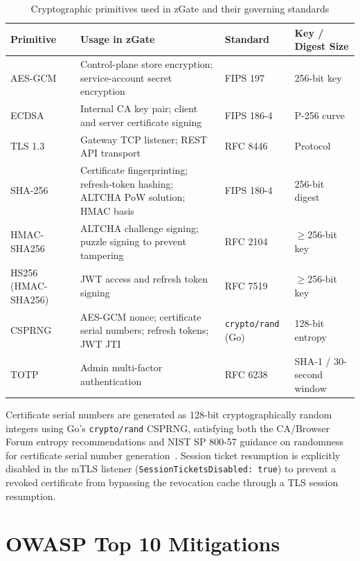 \begin{table}[H]
\small
\centering
\renewcommand{\arraystretch}{1.4}
\begin{tabularx}{\textwidth}{|p{2.8cm}|X|p{3.0cm}|p{3.5cm}|}
\hline

\textbf{Primitive} & \textbf{Usage in zGate} & \textbf{Standard} & \textbf{Key / Digest Size} \\
\hline
AES-GCM & Control-plane store encryption; service-account secret encryption & FIPS 197~\cite{fips-197} & 256-bit key \\
\hline
ECDSA & Internal CA key pair; client and server certificate signing & FIPS 186-4~\cite{fips-186-4} & P-256 curve \\
\hline
TLS 1.3 & Gateway TCP listener; REST API transport & RFC 8446~\cite{tls13} & Protocol \\
\hline
SHA-256 & Certificate fingerprinting; refresh-token hashing; ALTCHA PoW solution; HMAC basis & FIPS 180-4~\cite{fips-180-4} & 256-bit digest \\
\hline
HMAC-SHA256 & ALTCHA challenge signing; puzzle signing to prevent tampering & RFC 2104~\cite{rfc-2104} & $\geq$256-bit key \\
\hline
HS256 (HMAC-SHA256) & JWT access and refresh token signing & RFC 7519~\cite{rfc-7519} & $\geq$256-bit key \\
\hline
CSPRNG & AES-GCM nonce; certificate serial numbers; refresh tokens; JWT JTI & \texttt{crypto/rand} (Go) & 128-bit entropy \\
\hline
TOTP & Admin multi-factor authentication & RFC 6238~\cite{rfc-6238} & SHA-1 / 30-second window \\
\hline
\end{tabularx}
\caption{Cryptographic primitives used in zGate and their governing standards}
\label{tab:crypto-standards}
\end{table}

Certificate serial numbers are generated as 128-bit cryptographically random integers using Go's \texttt{crypto/rand} CSPRNG, satisfying both the CA/Browser Forum entropy recommendations and NIST SP 800-57 guidance on randomness for certificate serial number generation~\cite{nist-key}. Session ticket resumption is explicitly disabled in the mTLS listener (\texttt{SessionTickets\-Disabled:~true}) to prevent a revoked certificate from bypassing the revocation cache through a TLS session resumption.

\section{OWASP Top 10 Mitigations}

